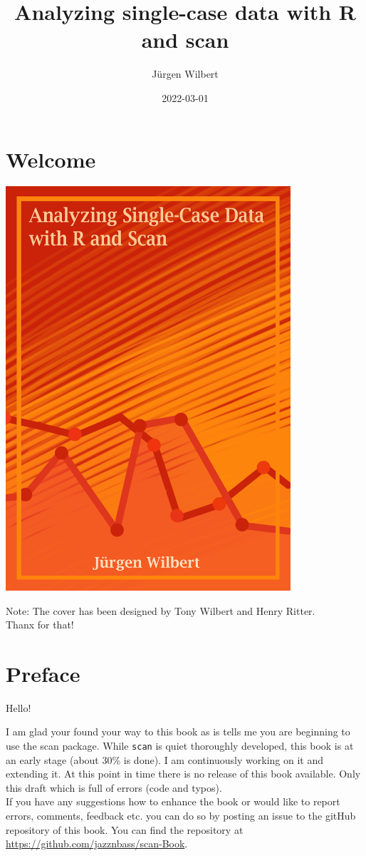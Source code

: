 \documentclass[
]{book}
\title{Analyzing single-case data with R and scan}
\author{Jürgen Wilbert}
\date{2022-03-01}
\begin{document}
\maketitle

{
\setcounter{tocdepth}{1}
\tableofcontents
}
\hypertarget{welcome}{%
\chapter*{Welcome}\label{welcome}}

\includegraphics[width=4.16667in,height=\textheight]{images/cover.png}

Note: The cover has been designed by Tony Wilbert and Henry Ritter.\\
Thanx for that!

\hypertarget{preface}{%
\chapter*{Preface}\label{preface}}

Hello!

I am glad your found your way to this book as is tells me you are beginning to use the scan package. While \texttt{scan} is quiet thoroughly developed, this book is at an early stage (about 30\% is done). I am continuously working on it and extending it. At this point in time there is no release of this book available. Only this draft which is full of errors (code and typos).\\
If you have any suggestions how to enhance the book or would like to report errors, comments, feedback etc. you can do so by posting an issue to the gitHub repository of this book. You can find the repository at \url{https://github.com/jazznbass/scan-Book}.
\end{document}
